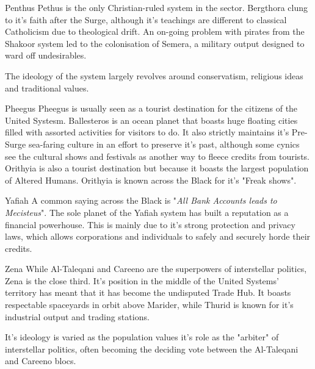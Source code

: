 \begin{multicols}{2}
  \begin{genericsection}{Penthus}
  Pethus is the only Christian-ruled system in the sector. Bergthora clung to it's faith after the Surge, although it's teachings are different to classical Catholicism due to theological drift. An on-going problem with pirates from the Shakoor system led to the colonisation of Semera, a military output designed to ward off undesirables.
  
  The ideology of the system largely revolves around conservatism, religious ideas and traditional values.
  \end{genericsection}
  
  \begin{genericsection}{Pheegus}
  Pheegus is usually seen as a tourist destination for the citizens of the United Systesm. Ballesteros is an ocean planet that boasts huge floating cities filled with assorted activities for visitors to do. It also strictly maintains it's Pre-Surge sea-faring culture in an effort to preserve it's past, although some cynics see the cultural shows and festivals as another way to fleece credits from tourists. Orithyia is also a tourist destination but because it boasts the largest population of Altered Humans. Orithyia is known across the Black for it's "Freak shows".
  \end{genericsection}
  
  \begin{genericsection}{Yafiah}
  A common saying across the Black is "\textit{All Bank Accounts leads to Mecisteus}". The sole planet of the Yafiah system has built a reputation as a financial powerhouse. This is mainly due to it's strong protection and privacy laws, which allows corporations and individuals to safely and securely horde their credits.
  \end{genericsection}
  
  \begin{genericsection}{Zena}
  While Al-Taleqani and Careeno are the superpowers of interstellar politics, Zena is the close third. It's position in the middle of the United Systems' territory has meant that it has become the undisputed Trade Hub. It boasts respectable spaceyards in orbit above Marider, while Thurid is known for it's industrial output and trading stations.
  
  It's ideology is varied as the population values it's role as the "arbiter" of interstellar politics, often becoming the deciding vote between the Al-Taleqani and Careeno blocs.
  \end{genericsection}
  

\end{multicols}
